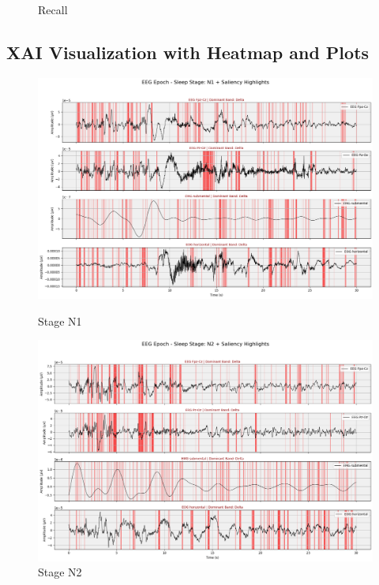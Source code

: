 \begin{figure}[htbp]
\begin{minipage}[b]{0.31\linewidth}
		\caption{Recall}
		\label{fig:recallplot}
	\end{minipage}
\end{figure}



















\subsection{XAI Visualization with Heatmap and Plots}

\begin{figure}[H]
	\centering
	\begin{minipage}[b]{0.45\linewidth}
		\includegraphics[width=\linewidth]{"img/paper_3/stage n1"}
		\caption{Stage N1}
		\label{fig:stage-n1}
	\end{minipage}
	\hfill
	\begin{minipage}[b]{0.45\linewidth}
		\includegraphics[width=\linewidth]{"img/paper_3/stage n2"}
		\caption{Stage N2}
		\label{fig:stage-n2}
	\end{minipage}
\end{figure}

